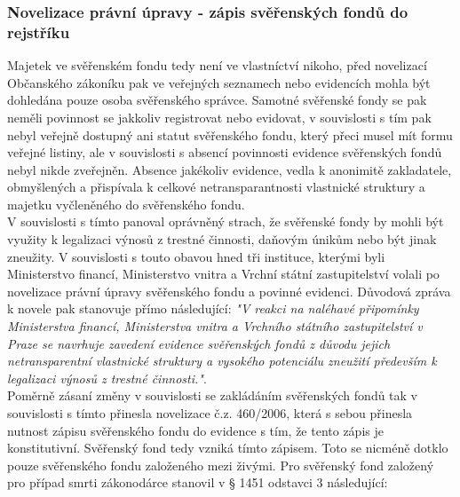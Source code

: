 \documentclass{article}
\begin{document}
\subsubsection{Novelizace právní úpravy - zápis svěřenských fondů do rejstříku}

Majetek ve svěřenském fondu tedy není ve vlastníctví nikoho, před novelizací Občanského zákoníku pak ve veřejných seznamech nebo evidencích mohla být dohledána pouze osoba svěřenského správce. Samotné svěřenské fondy se pak neměli povinnost se jakkoliv registrovat nebo evidovat, v souvislosti s tím pak nebyl veřejně dostupný ani statut svěřenského fondu, který přeci musel mít formu veřejné listiny, ale v souvislosti s absencí povinnosti evidence svěřenských fondů nebyl nikde zveřejněn. Absence jakékoliv evidence, vedla k anonimitě zakladatele, obmyšlených a přispívala k celkové netransparantnosti vlastnické struktury a majetku vyčleněného do svěřenského fondu.\\

V souvislosti s tímto panoval oprávněný strach, že svěřenské fondy by mohli být využity k legalizaci výnosů z trestné činnosti, daňovým únikům nebo být jinak zneužity. V souvislosti s touto obavou hned tři instituce, kterými byli Ministerstvo financí, Ministerstvo vnitra a Vrchní státní zastupitelství volali po novelizace právní úpravy svěřenského fondu a povinné evidenci. Důvodová zpráva k novele pak stanovuje přímo následující: \textit{"V reakci na naléhavé připomínky Ministerstva financí, Ministerstva vnitra a Vrchního státního zastupitelství v Praze se navrhuje zavedení evidence svěřenských fondů z důvodu jejich netransparentní vlastnické struktury a vysokého potenciálu zneužití především k legalizaci výnosů z trestné činnosti."}.\\



Poměrně zásaní změny v souvislosti se zakládáním svěřenských fondů tak v souvislosti s tímto přinesla novelizace č.z. 460/2006, která s sebou přinesla nutnost zápisu svěřenského fondu do evidence s tím, že tento zápis je konstitutivní. Svěřenský fond tedy vzniká tímto zápisem. Toto se nicméně dotklo pouze svěřenského fondu založeného mezi živými. Pro svěřenský fond založený pro případ smrti zákonodárce stanovil v § 1451 odstavci 3 následující:\\
\end{document}
